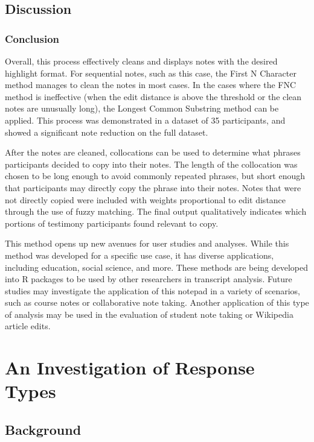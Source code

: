 \documentclass[print]{nuthesis}
\begin{document}
\hypertarget{discussion-1}{%
\section{Discussion}\label{discussion-1}}

\hypertarget{conclusion-1}{%
\subsection{Conclusion}\label{conclusion-1}}

Overall, this process effectively cleans and displays notes with the desired highlight format.
For sequential notes, such as this case, the First N Character method manages to clean the notes in most cases.
In the cases where the FNC method is ineffective (when the edit distance is above the threshold or the clean notes are unusually long), the Longest Common Substring method can be applied.
This process was demonstrated in a dataset of 35 participants, and showed a significant note reduction on the full dataset.

After the notes are cleaned, collocations can be used to determine what phrases participants decided to copy into their notes.
The length of the collocation was chosen to be long enough to avoid commonly repeated phrases, but short enough that participants may directly copy the phrase into their notes.
Notes that were not directly copied were included with weights proportional to edit distance through the use of fuzzy matching.
The final output qualitatively indicates which portions of testimony participants found relevant to copy.

This method opens up new avenues for user studies and analyses.
While this method was developed for a specific use case, it has diverse applications, including education, social science, and more.
These methods are being developed into R packages to be used by other
researchers in transcript analysis.
Future studies may investigate the application of this notepad in a variety of scenarios, such as course notes or collaborative note
taking.
Another application of this type of analysis may be used in the evaluation of student note taking or Wikipedia article edits.

\hypertarget{study2}{%
\chapter{An Investigation of Response Types}\label{study2}}

\hypertarget{background-1}{%
\section{Background}\label{background-1}}
\end{document}
